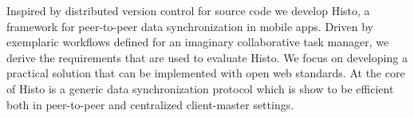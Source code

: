 

Inspired by distributed version control for source code we develop Histo, a framework for peer-to-peer data synchronization in mobile apps.
Driven by exemplaric workflows defined for an imaginary collaborative task manager, we derive the requirements that are used to evaluate Histo.
We focus on developing a practical solution that can be implemented with open web standards.
At the core of Histo is a generic data synchronization protocol which is show to be efficient both in peer-to-peer and centralized client-master settings.